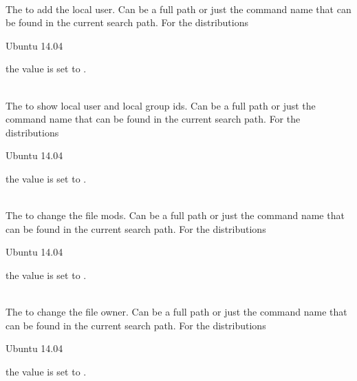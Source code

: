 \\

The  to add the local user. Can be a full path or
just the command name that can be found in the current search path. 
For the distributions
\begin{inparaitem}
\item[\TheDistribution{ubuntu}] Ubuntu 14.04
\end{inparaitem}
the value is set to .

\\

The  to show local user and local group ids. Can be a full path or
just the command name that can be found in the current search path. 
For the distributions
\begin{inparaitem}
\item[\TheDistribution{ubuntu}] Ubuntu 14.04
\end{inparaitem}
the value is set to .

\\

The  to change the file mods. Can be a full path or
just the command name that can be found in the current search path. 
For the distributions
\begin{inparaitem}
\item[\TheDistribution{ubuntu}] Ubuntu 14.04
\end{inparaitem}
the value is set to .

\\

The  to change the file owner. Can be a full path or
just the command name that can be found in the current search path. 
For the distributions
\begin{inparaitem}
\item[\TheDistribution{ubuntu}] Ubuntu 14.04
\end{inparaitem}
the value is set to .

